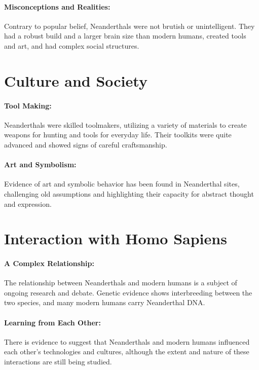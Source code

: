 \documentclass{book}
\begin{document}
\paragraph{Misconceptions and Realities:}
Contrary to popular belief, Neanderthals were not brutish or unintelligent. They had a robust build and a larger brain size than modern humans, created tools and art, and had complex social structures.

\section*{Culture and Society}

\paragraph{Tool Making:}
Neanderthals were skilled toolmakers, utilizing a variety of materials to create weapons for hunting and tools for everyday life. Their toolkits were quite advanced and showed signs of careful craftsmanship.

\paragraph{Art and Symbolism:}
Evidence of art and symbolic behavior has been found in Neanderthal sites, challenging old assumptions and highlighting their capacity for abstract thought and expression.

\section*{Interaction with Homo Sapiens}

\paragraph{A Complex Relationship:}
The relationship between Neanderthals and modern humans is a subject of ongoing research and debate. Genetic evidence shows interbreeding between the two species, and many modern humans carry Neanderthal DNA.

\paragraph{Learning from Each Other:}
There is evidence to suggest that Neanderthals and modern humans influenced each other’s technologies and cultures, although the extent and nature of these interactions are still being studied.
\end{document}
